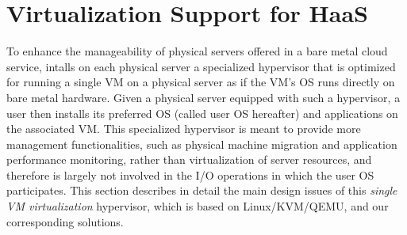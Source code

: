 \section{Virtualization Support for HaaS}



To enhance the manageability of physical servers offered in a bare metal cloud service, \na intalls 
on each physical server a specialized hypervisor that is optimized for running a single VM on a physical
server as if the VM's OS runs directly on bare metal hardware.
Given a physical server equipped with such a hypervisor, a \na user then installs its preferred OS (called user OS hereafter) and applications on the associated VM. 
This specialized hypervisor is meant to provide more management functionalities, such as 
physical machine migration and application performance monitoring, rather than virtualization of server resources, and therefore
is largely not involved in the I/O operations in which the user OS participates.
This section describes in detail the main design issues of this {\em single VM virtualization} hypervisor, 
which is based on Linux/KVM/QEMU, and our corresponding solutions.

